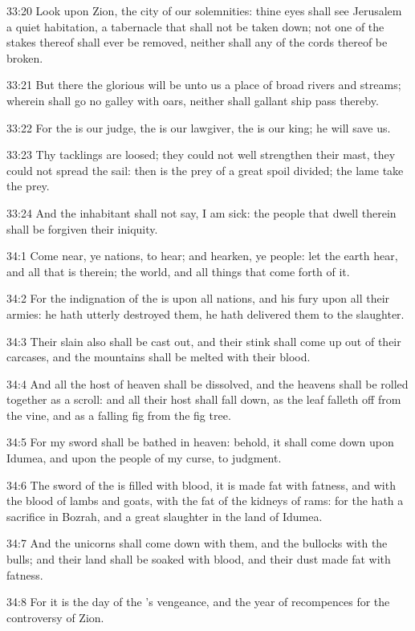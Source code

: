 33:20 Look upon Zion, the city of our solemnities: thine eyes shall
see Jerusalem a quiet habitation, a tabernacle that shall not be taken
down; not one of the stakes thereof shall ever be removed, neither
shall any of the cords thereof be broken.

33:21 But there the glorious \LORD will be unto us a place of broad
rivers and streams; wherein shall go no galley with oars, neither
shall gallant ship pass thereby.

33:22 For the \LORD is our judge, the \LORD is our lawgiver, the \LORD is
our king; he will save us.

33:23 Thy tacklings are loosed; they could not well strengthen their
mast, they could not spread the sail: then is the prey of a great
spoil divided; the lame take the prey.

33:24 And the inhabitant shall not say, I am sick: the people that
dwell therein shall be forgiven their iniquity.

34:1 Come near, ye nations, to hear; and hearken, ye people: let the
earth hear, and all that is therein; the world, and all things that
come forth of it.

34:2 For the indignation of the \LORD is upon all nations, and his fury
upon all their armies: he hath utterly destroyed them, he hath
delivered them to the slaughter.

34:3 Their slain also shall be cast out, and their stink shall come up
out of their carcases, and the mountains shall be melted with their
blood.

34:4 And all the host of heaven shall be dissolved, and the heavens
shall be rolled together as a scroll: and all their host shall fall
down, as the leaf falleth off from the vine, and as a falling fig from
the fig tree.

34:5 For my sword shall be bathed in heaven: behold, it shall come
down upon Idumea, and upon the people of my curse, to judgment.

34:6 The sword of the \LORD is filled with blood, it is made fat with
fatness, and with the blood of lambs and goats, with the fat of the
kidneys of rams: for the \LORD hath a sacrifice in Bozrah, and a great
slaughter in the land of Idumea.

34:7 And the unicorns shall come down with them, and the bullocks with
the bulls; and their land shall be soaked with blood, and their dust
made fat with fatness.

34:8 For it is the day of the \LORD's vengeance, and the year of
recompences for the controversy of Zion.

